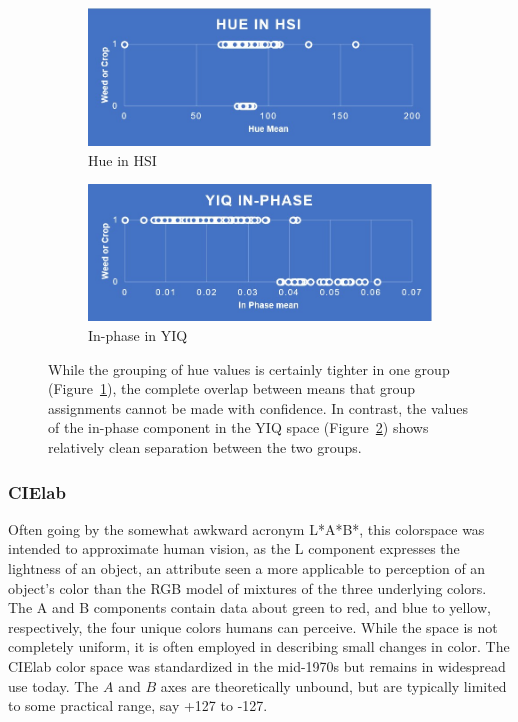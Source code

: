 \documentclass[letterpaper]{article}
\begin{document}
{\begin{figure}[H]
	\begin{subfigure}[h]{0.48\linewidth}
		\includegraphics[width=1\linewidth]{./figures/hsi-hue.jpg}
		\caption{Hue in HSI}
		\label{subfig:hue}	
	\end{subfigure}
	\hfill
	\begin{subfigure}[h]{0.48\linewidth}
		\includegraphics[width=1\linewidth]{./figures/yiq-in-phase.jpg}
		\caption{In-phase in YIQ}
		\label{subfig:in_phase}		
	\end{subfigure}%
	\caption[Prediction using hue in HSI and In-phase in YIQ]{While the grouping of hue values is certainly tighter in one group (Figure~\ref{subfig:hue}), the complete overlap between means that group assignments cannot be made with confidence. In contrast, the values of the in-phase component in the YIQ space (Figure~\ref{subfig:in_phase}) shows relatively clean separation between the two groups.}
	\label{fig:hue_vs_inphase}
\end{figure}



\subsubsection{CIElab}
Often going by the somewhat awkward acronym L*A*B*, this colorspace was intended to approximate human vision, as the L component expresses  the lightness of an object, an attribute seen a more applicable to perception of an object's color than the RGB model of mixtures of the three underlying colors.  The A and B components contain data about green to red, and blue to yellow, respectively, the four unique colors humans can perceive. While the space is not completely uniform, it is often employed in describing small changes in color. The CIElab color space was standardized in the mid-1970s but remains in widespread use today. \parencite{Wikipedia_contributors2023-xt}  The $A$ and $B$ axes are theoretically unbound, but are typically limited to some practical range, say +127 to -127. 

}
\end{document}
